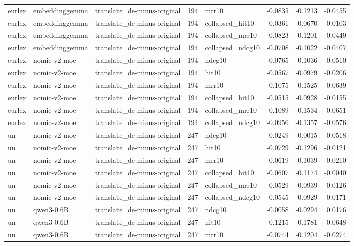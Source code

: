 \begin{tabular}{lllrlrrr}
eurlex & embeddinggemma & translate\_de-minus-original & 194 & mrr10 & -0.0835 & -0.1213 & -0.0455 \\
eurlex & embeddinggemma & translate\_de-minus-original & 194 & collapsed\_hit10 & -0.0361 & -0.0670 & -0.0103 \\
eurlex & embeddinggemma & translate\_de-minus-original & 194 & collapsed\_mrr10 & -0.0823 & -0.1201 & -0.0449 \\
eurlex & embeddinggemma & translate\_de-minus-original & 194 & collapsed\_ndcg10 & -0.0708 & -0.1022 & -0.0407 \\
eurlex & nomic-v2-moe & translate\_de-minus-original & 194 & ndcg10 & -0.0765 & -0.1036 & -0.0510 \\
eurlex & nomic-v2-moe & translate\_de-minus-original & 194 & hit10 & -0.0567 & -0.0979 & -0.0206 \\
eurlex & nomic-v2-moe & translate\_de-minus-original & 194 & mrr10 & -0.1075 & -0.1525 & -0.0639 \\
eurlex & nomic-v2-moe & translate\_de-minus-original & 194 & collapsed\_hit10 & -0.0515 & -0.0928 & -0.0155 \\
eurlex & nomic-v2-moe & translate\_de-minus-original & 194 & collapsed\_mrr10 & -0.1089 & -0.1534 & -0.0651 \\
eurlex & nomic-v2-moe & translate\_de-minus-original & 194 & collapsed\_ndcg10 & -0.0956 & -0.1357 & -0.0576 \\
un & nomic-v2-moe & translate\_de-minus-original & 247 & ndcg10 & 0.0249 & -0.0015 & 0.0518 \\
un & nomic-v2-moe & translate\_de-minus-original & 247 & hit10 & -0.0729 & -0.1296 & -0.0121 \\
un & nomic-v2-moe & translate\_de-minus-original & 247 & mrr10 & -0.0619 & -0.1039 & -0.0210 \\
un & nomic-v2-moe & translate\_de-minus-original & 247 & collapsed\_hit10 & -0.0607 & -0.1174 & -0.0040 \\
un & nomic-v2-moe & translate\_de-minus-original & 247 & collapsed\_mrr10 & -0.0529 & -0.0939 & -0.0126 \\
un & nomic-v2-moe & translate\_de-minus-original & 247 & collapsed\_ndcg10 & -0.0545 & -0.0929 & -0.0171 \\
un & qwen3-0.6B & translate\_de-minus-original & 247 & ndcg10 & -0.0058 & -0.0294 & 0.0176 \\
un & qwen3-0.6B & translate\_de-minus-original & 247 & hit10 & -0.1215 & -0.1781 & -0.0648 \\
un & qwen3-0.6B & translate\_de-minus-original & 247 & mrr10 & -0.0744 & -0.1204 & -0.0274 \\

\end{tabular}
